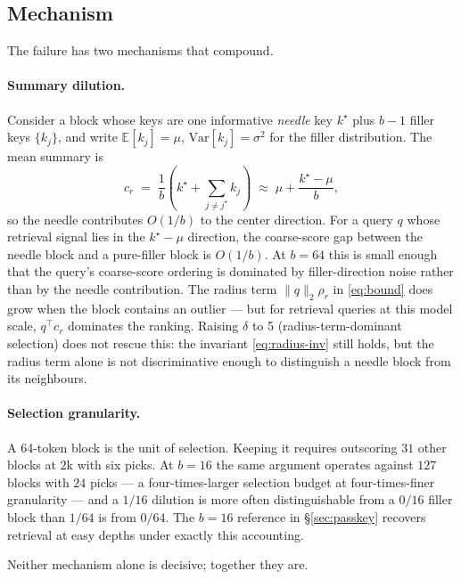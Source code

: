 \documentclass[11pt]{article}
\theoremstyle{plain}
\theoremstyle{definition}
\newcommand{\normq}{\lVert q \rVert_2}
\newcommand{\rad}{\rho_r}
\begin{document}
\subsection{Mechanism}
\label{sec:passkey-mechanism}

The failure has two mechanisms that compound.

\paragraph{Summary dilution.}
Consider a block whose keys are one informative \emph{needle} key $k^\star$
plus $b - 1$ filler keys $\{k_j\}$, and write
$\mathbb{E}[k_j] = \mu$, $\mathrm{Var}[k_j] = \sigma^2$ for the filler
distribution. The mean summary is
\begin{equation}
c_r \;=\; \frac{1}{b}\left(k^\star + \sum_{j \ne j^\star} k_j\right) \;\approx\; \mu + \frac{k^\star - \mu}{b},
\end{equation}
so the needle contributes $O(1/b)$ to the center direction. For a query
$q$ whose retrieval signal lies in the $k^\star - \mu$ direction, the
coarse-score gap between the needle block and a pure-filler block is
$O(1/b)$. At $b = 64$ this is small enough that the query's coarse-score
ordering is dominated by filler-direction noise rather than by the
needle contribution. The radius term $\normq \rad$ in \eqref{eq:bound}
does grow when the block contains an outlier --- but for retrieval
queries at this model scale, $q^{\top} c_r$ dominates the ranking.
Raising $\delta$ to 5 (radius-term-dominant selection) does not rescue
this: the invariant \eqref{eq:radius-inv} still holds, but the radius
term alone is not discriminative enough to distinguish a needle block
from its neighbours.

\paragraph{Selection granularity.}
A 64-token block is the unit of selection. Keeping it requires
outscoring $31$ other blocks at $2\mathrm{k}$ with six picks. At $b = 16$
the same argument operates against $127$ blocks with $24$ picks --- a
four-times-larger selection budget at four-times-finer granularity ---
and a $1/16$ dilution is more often distinguishable from a $0/16$ filler
block than $1/64$ is from $0/64$. The $b = 16$ reference in
\S\ref{sec:passkey} recovers retrieval at easy depths under exactly this
accounting.

Neither mechanism alone is decisive; together they are.
\end{document}
